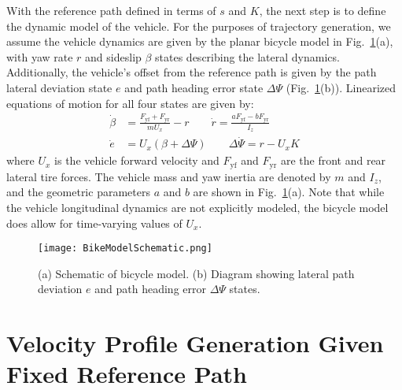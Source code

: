 \documentclass[twocolumn,10pt]{asme2ej}
\begin{document}
With the reference path defined in terms of $s$ and $K$, the 
next step is to define the dynamic model of the vehicle. For the purposes of trajectory generation, we assume the vehicle dynamics are given 
by the planar bicycle model in Fig.~\ref{fig:bikemodel}(a), with yaw rate $r$ and sideslip $\beta$ states describing the lateral dynamics. Additionally, the vehicle's offset from
the reference path is given by the path lateral deviation state $e$ and path heading error state $\Delta\Psi$ (Fig.~\ref{fig:bikemodel}(b)). Linearized equations of
motion for all four states are given by:
\begin{subequations}
\label{eq:bm}
\begin{align}
	\dot{\beta} &= \frac{F_\mathrm{yf}+F_\mathrm{yr}}{mU_x} - r \qquad \dot{r} = \frac{aF_\mathrm{yf} - bF_\mathrm{yr}}{I_z} \label{bm1} \\
	\dot{e} &= U_x (\beta + \Delta\Psi) \qquad \Delta\dot{\Psi} = r - U_xK \label{eq:bm2} 
\end{align}
\end{subequations}
where $U_x$ is the vehicle forward velocity and $F_\mathrm{yf}$ and $F_\mathrm{yr}$ are the front and rear lateral tire forces. 
The vehicle mass and yaw inertia are denoted by $m$ and $I_z$, and the geometric parameters $a$ and $b$ are shown in Fig.~\ref{fig:bikemodel}(a). Note
that while the vehicle longitudinal dynamics are not explicitly modeled, the bicycle model does allow for time-varying values of $U_x$.

  
\begin{figure}
\centering
\texttt{[image: BikeModelSchematic.png]}
\caption{(a) Schematic of bicycle model. (b) Diagram showing lateral path deviation $e$ and path heading error $\Delta\Psi$ states.}
\label{fig:bikemodel}
\end{figure} 

\section{Velocity Profile Generation Given Fixed Reference Path}
\label{sec:VP}
\end{document}
